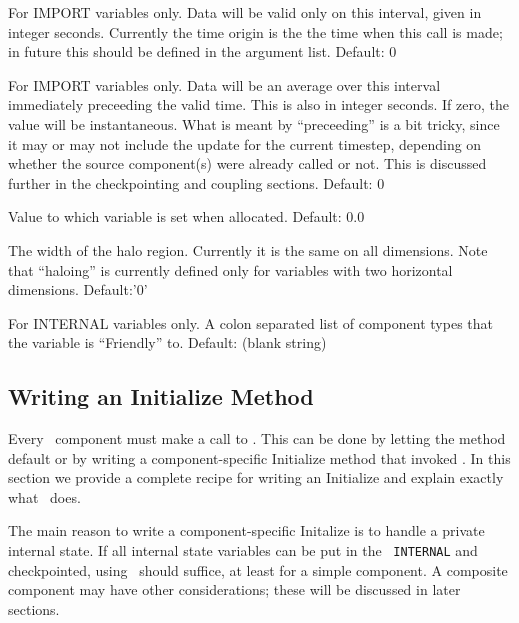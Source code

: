          \parbox[t]{4in}{For IMPORT variables only. Data will be
    valid  only on this interval, given in integer seconds. Currently the time origin is the
     the time when this call is made; in future this should be defined
     in the argument list. Default: 0}

         \parbox[t]{4in}{For IMPORT variables only. Data will be
     an average over this interval immediately preceeding the valid time. 
     This is also in integer seconds. If zero, the value will be
     instantaneous. What is meant by ``preceeding'' is a bit tricky,
    since it may or may not include the update for the current
    timestep, depending on whether the source component(s) were
    already called or not. This is discussed further in the 
    checkpointing and coupling sections. Default: 0}

         \parbox[t]{4in}{Value to which variable is set when allocated. Default: 0.0 }

         \parbox[t]{4in}{The width of the halo region. Currently it is the same
         on all dimensions. Note that ``haloing'' is
         currently defined only for variables with two horizontal 
         dimensions.  Default:'0' }

         \parbox[t]{4in}{For INTERNAL variables
         only. A colon separated list of component types
         that the variable is ``Friendly'' to.  Default: (blank string) }


\subsection{Writing an Initialize Method}

Every \ggn\  component must make a call to \gint. This can be done by
letting the method default or by writing a component-specific
Initialize method that invoked \gint.  In this section we provide a
complete recipe for writing an Initialize and explain exactly what
\gint\  does.

The main reason to write a component-specific Initalize is to handle a
private internal state. If all internal state variables can be put in
the \ggn\  {\tt INTERNAL} and checkpointed, using \gint\  should
suffice, at least for a simple component. A composite component may
have other considerations; these will be discussed in later
sections.

